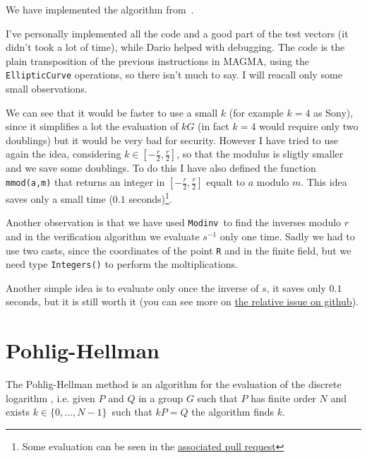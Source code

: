 \documentclass{article}
\theoremstyle{plain}
\theoremstyle{remark}
\theoremstyle{definition}
\begin{document}
We have implemented the algorithm from~\cite[Section 6.6]{washington}.

I've personally implemented all the code and a good part of the test vectors (it didn't took a lot of time), while Dario helped with debugging. The code is the plain transposition of the previous instructions in MAGMA, using the \texttt{EllipticCurve} operations, so there isn't much to say. I will reacall only some small observations.

We can see that it would be faster to use a small $k$ (for example $k = 4$ as Sony), since it simplifies a lot the evaluation of $kG$ (in fact $k=4$ would require only two doublings) but it would be very bad for security. 
However I have tried to use again the idea, considering $k \in [-\frac{r}{2}, \frac{r}{2}]$, so that the modulus is sligtly smaller and we save some doublings. To do this I have also defined the function \texttt{mmod(a,m)} that returns an integer in $[-\frac{r}{2}, \frac{r}{2}]$ equalt to $a$ modulo $m$. This idea saves only a small time ($0.1$ seconds)\footnote{Some evaluation can be seen in the \href{https://github.com/giacomoborin/project2_MAGMA/pull/36}{associated pull request}}.

Another observation is that we have used \texttt{Modinv} to find the inverses modulo $r$ and in the verification algorithm we evaluate $s^{-1}$ only one time. Sadly we had to use two casts, since the coordinates of the point \texttt{R} and in the finite field, but we need type \texttt{Integers()} to perform the moltiplications. 



Another simple idea is to evaluate only once the inverse of $s$, it saves only $0.1$ seconds, but it is still worth it (you can see more on \href{https://github.com/giacomoborin/project2_MAGMA/issues/13}{the relative issue on github}).

\section{Pohlig-Hellman}

The Pohlig-Hellman method is an algorithm for the evaluation of the discrete logarithm %
, i.e. given $P$ and $Q$ in a group $G$ such that $P$ has finite order $N$ and exists $k\in \{0,...,N-1\}$ such that $kP = Q$ the algorithm finds $k$. 
\end{document}

